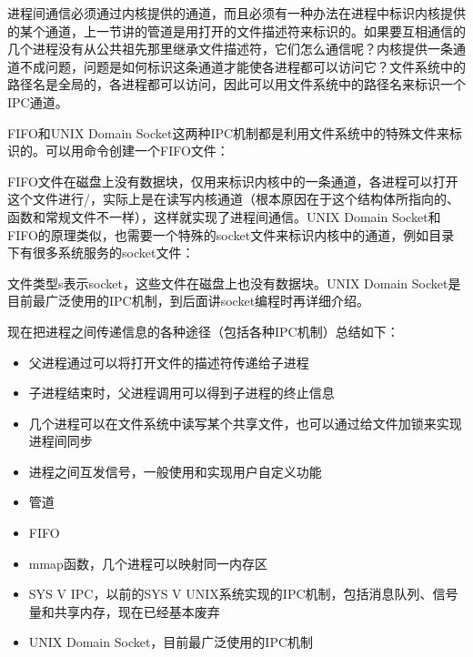 进程间通信必须通过内核提供的通道，而且必须有一种办法在进程中标识内核提供的某个通道，上一节讲的管道是用打开的文件描述符来标识的。如果要互相通信的几个进程没有从公共祖先那里继承文件描述符，它们怎么通信呢？内核提供一条通道不成问题，问题是如何标识这条通道才能使各进程都可以访问它？文件系统中的路径名是全局的，各进程都可以访问，因此可以用文件系统中的路径名来标识一个IPC通道。



FIFO和UNIX Domain Socket这两种IPC机制都是利用文件系统中的特殊文件来标识的。可以用命令创建一个FIFO文件：




FIFO文件在磁盘上没有数据块，仅用来标识内核中的一条通道，各进程可以打开这个文件进行/，实际上是在读写内核通道（根本原因在于这个结构体所指向的、函数和常规文件不一样），这样就实现了进程间通信。UNIX Domain Socket和FIFO的原理类似，也需要一个特殊的socket文件来标识内核中的通道，例如目录下有很多系统服务的socket文件：




文件类型s表示socket，这些文件在磁盘上也没有数据块。UNIX Domain Socket是目前最广泛使用的IPC机制，到后面讲socket编程时再详细介绍。



现在把进程之间传递信息的各种途径（包括各种IPC机制）总结如下：


\begin{itemize}

\item 父进程通过可以将打开文件的描述符传递给子进程

\item 子进程结束时，父进程调用可以得到子进程的终止信息

\item 几个进程可以在文件系统中读写某个共享文件，也可以通过给文件加锁来实现进程间同步

\item 进程之间互发信号，一般使用和实现用户自定义功能

\item 管道

\item FIFO

\item mmap函数，几个进程可以映射同一内存区

\item SYS V IPC，以前的SYS V UNIX系统实现的IPC机制，包括消息队列、信号量和共享内存，现在已经基本废弃

\item UNIX Domain Socket，目前最广泛使用的IPC机制
\end{itemize}


